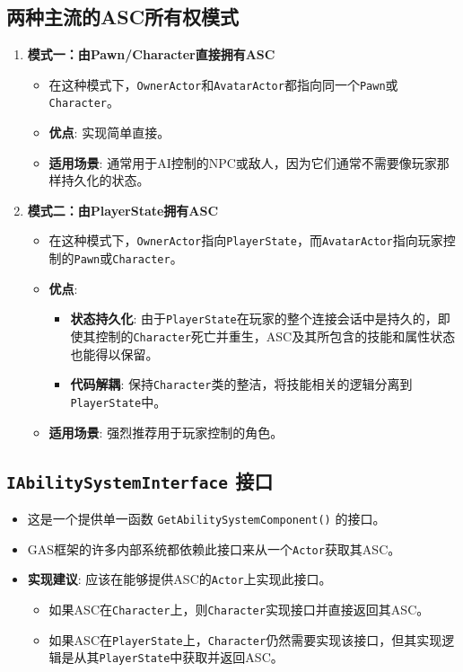 \documentclass[math,code,10pt,CJKmath]{amznotes}
\begin{document}
\subsection{两种主流的ASC所有权模式}
\begin{enumerate}
    \item \textbf{模式一：由Pawn/Character直接拥有ASC}
    \begin{itemize}
        \item 在这种模式下，\texttt{OwnerActor}和\texttt{AvatarActor}都指向同一个\texttt{Pawn}或\texttt{Character}。
        \item \textbf{优点}: 实现简单直接。
        \item \textbf{适用场景}: 通常用于AI控制的NPC或敌人，因为它们通常不需要像玩家那样持久化的状态。
    \end{itemize}
    
    \item \textbf{模式二：由PlayerState拥有ASC}
    \begin{itemize}
        \item 在这种模式下，\texttt{OwnerActor}指向\texttt{PlayerState}，而\texttt{AvatarActor}指向玩家控制的\texttt{Pawn}或\texttt{Character}。
        \item \textbf{优点}:
        \begin{itemize}
            \item \textbf{状态持久化}: 由于\texttt{PlayerState}在玩家的整个连接会话中是持久的，即使其控制的\texttt{Character}死亡并重生，ASC及其所包含的技能和属性状态也能得以保留。
            \item \textbf{代码解耦}: 保持\texttt{Character}类的整洁，将技能相关的逻辑分离到\texttt{PlayerState}中。
        \end{itemize}
        \item \textbf{适用场景}: 强烈推荐用于玩家控制的角色。
    \end{itemize}
\end{enumerate}

\subsection{\texttt{IAbilitySystemInterface} 接口}
\begin{itemize}
    \item 这是一个提供单一函数 \texttt{GetAbilitySystemComponent()} 的接口。
    \item GAS框架的许多内部系统都依赖此接口来从一个\texttt{Actor}获取其ASC。
    \item \textbf{实现建议}: 应该在能够提供ASC的\texttt{Actor}上实现此接口。
    \begin{itemize}
        \item 如果ASC在\texttt{Character}上，则\texttt{Character}实现接口并直接返回其ASC。
        \item 如果ASC在\texttt{PlayerState}上，\texttt{Character}仍然需要实现该接口，但其实现逻辑是从其\texttt{PlayerState}中获取并返回ASC。
    \end{itemize}
\end{itemize}
\end{document}
